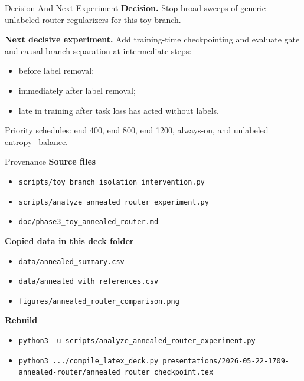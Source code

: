 \documentclass[aspectratio=169]{beamer}
\begin{document}
\begin{frame}{Decision And Next Experiment}
  \textbf{Decision.} Stop broad sweeps of generic unlabeled router regularizers
  for this toy branch.

  \vspace{0.8em}
  \textbf{Next decisive experiment.}
  Add training-time checkpointing and evaluate gate and causal branch separation
  at intermediate steps:
  \begin{itemize}
    \item before label removal;
    \item immediately after label removal;
    \item late in training after task loss has acted without labels.
  \end{itemize}

  \vspace{0.8em}
  Priority schedules: end 400, end 800, end 1200, always-on, and unlabeled
  entropy+balance.
\end{frame}

\begin{frame}{Provenance}
  \small
  \textbf{Source files}
  \begin{itemize}
    \item \texttt{scripts/toy\_branch\_isolation\_intervention.py}
    \item \texttt{scripts/analyze\_annealed\_router\_experiment.py}
    \item \texttt{doc/phase3\_toy\_annealed\_router.md}
  \end{itemize}

  \vspace{0.5em}
  \textbf{Copied data in this deck folder}
  \begin{itemize}
    \item \texttt{data/annealed\_summary.csv}
    \item \texttt{data/annealed\_with\_references.csv}
    \item \texttt{figures/annealed\_router\_comparison.png}
  \end{itemize}

  \vspace{0.5em}
  \textbf{Rebuild}
  \begin{itemize}
    \item \texttt{python3 -u scripts/analyze\_annealed\_router\_experiment.py}
    \item \texttt{python3 .../compile\_latex\_deck.py presentations/2026-05-22-1709-annealed-router/annealed\_router\_checkpoint.tex}
  \end{itemize}
\end{frame}
\end{document}
